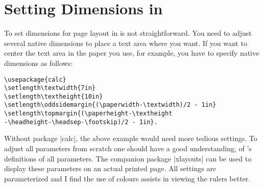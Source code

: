 \clearpage

\restoregeometry


\lipsum[1]


\begin{adjustmargins}{-0.4\textwidth}{0.1\textwidth}
\topline

%

\bottomline
\end{adjustmargins}

\lipsum[2]


 
\section{Setting Dimensions in \latex}

To set dimensions for page layout in \latex is not straightforward. You need to adjust several \latex
native dimensions to place a text area where you want. If you want to center the text area in the paper
you use, for example, you have to specify native dimensions as follows:

\begin{verbatim}
\usepackage{calc}
\setlength\textwidth{7in}
\setlength\textheight{10in}
\setlength\oddsidemargin{(\paperwidth-\textwidth)/2 - 1in}
\setlength\topmargin{(\paperheight-\textheight
-\headheight-\headsep-\footskip)/2 - 1in}.
\end{verbatim}

Without package |calc|, the above example would need more tedious settings. To adjust all parameters from scratch one should have a good understanding, of \latexe's definitions of all parameters. The companion package |xlayouts| can be used to display these parameters on an actual printed page. All settings are parameterized and I find the use of colours assists in viewing the rulers better.


